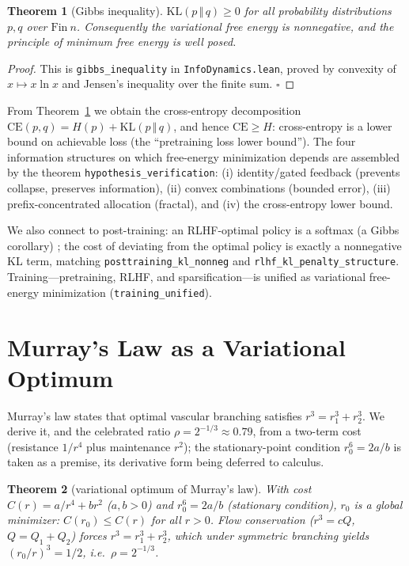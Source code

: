 \documentclass[conference]{IEEEtran}
\newtheorem{theorem}{Theorem}
\begin{document}
\begin{theorem}[Gibbs inequality]
\label{thm:gibbs}
$\mathrm{KL}(p\,\Vert\,q)\ge0$ for all probability distributions $p,q$ over
$\mathrm{Fin}\ n$. Consequently the variational free energy is nonnegative, and
the principle of minimum free energy is well posed.
\end{theorem}

\begin{proof}
This is \texttt{gibbs\_inequality} in \texttt{InfoDynamics.lean}, proved by
convexity of $x\mapsto x\ln x$ and Jensen's inequality over the finite sum.
\hfill$\square$
\end{proof}

From Theorem~\ref{thm:gibbs} we obtain the cross-entropy decomposition
$\mathrm{CE}(p,q)=H(p)+\mathrm{KL}(p\,\Vert\,q)$, and hence
$\mathrm{CE}\ge H$: cross-entropy is a lower bound on achievable loss (the
``pretraining loss lower bound''). The four information structures on which
free-energy minimization depends are assembled by the theorem
\texttt{hypothesis\_verification}: (i) identity/gated feedback (prevents
collapse, preserves information), (ii) convex combinations (bounded error),
(iii) prefix-concentrated allocation (fractal), and (iv) the cross-entropy lower
bound.

We also connect to post-training: an RLHF-optimal policy is a softmax
(a Gibbs corollary) \cite{schulman2017,rafailov2023dpo}; the cost of deviating
from the optimal policy is exactly a nonnegative KL term, matching
\texttt{posttraining\_kl\_nonneg} and \texttt{rlhf\_kl\_penalty\_structure}.
Training---pretraining, RLHF, and sparsification---is unified as variational
free-energy minimization (\texttt{training\_unified}).

\section{Murray's Law as a Variational Optimum}
\label{sec:murray}
Murray's law states that optimal vascular branching satisfies
$r^3=r_1^3+r_2^3$. We derive it, and the celebrated ratio
$\rho=2^{-1/3}\approx0.79$, from a two-term cost (resistance $1/r^4$ plus
maintenance $r^2$); the stationary-point condition $r_0^6=2a/b$ is taken as a
premise, its derivative form being deferred to calculus.

\begin{theorem}[variational optimum of Murray's law]
\label{thm:murray}
With cost $C(r)=a/r^4+br^2$ ($a,b>0$) and $r_0^6=2a/b$ (stationary condition),
$r_0$ is a global minimizer: $C(r_0)\le C(r)$ for all $r>0$. Flow
conservation ($r^3=cQ$, $Q=Q_1+Q_2$) forces $r^3=r_1^3+r_2^3$, which under
symmetric branching yields $(r_0/r)^3=1/2$, i.e.\ $\rho=2^{-1/3}$.
\end{theorem}
\end{document}
